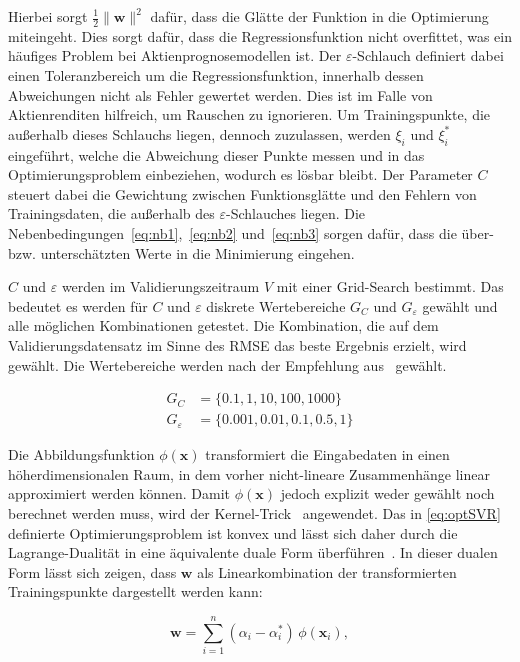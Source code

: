 Hierbei sorgt $\frac{1}{2}\|\mathbf{w}\|^2$ dafür, dass die Glätte der Funktion in die Optimierung miteingeht. Dies sorgt dafür, dass die Regressionsfunktion nicht overfittet, was ein häufiges Problem bei Aktienprognosemodellen ist. Der $\varepsilon$-Schlauch definiert dabei einen Toleranzbereich um die Regressionsfunktion, innerhalb dessen Abweichungen nicht als Fehler gewertet werden. Dies ist im Falle von Aktienrenditen hilfreich, um Rauschen zu ignorieren. Um Trainingspunkte, die außerhalb dieses Schlauchs liegen, dennoch zuzulassen, werden $\xi_i$ und $\xi_i^*$ eingeführt, welche die Abweichung dieser Punkte messen und in das Optimierungsproblem einbeziehen, wodurch es lösbar bleibt. Der Parameter $C$ steuert dabei die Gewichtung zwischen Funktionsglätte und den Fehlern von Trainingsdaten, die außerhalb des $\varepsilon$-Schlauches liegen. Die Nebenbedingungen~\ref{eq:nb1},~\ref{eq:nb2} und~\ref{eq:nb3} sorgen dafür, dass die über- bzw. unterschätzten Werte in die Minimierung eingehen.

$C$ und $\varepsilon$ werden im Validierungszeitraum $V$ mit einer Grid-Search bestimmt. Das bedeutet es werden für $C$ und $\varepsilon$ diskrete Wertebereiche $G_C$ und $G_\varepsilon$ gewählt und alle möglichen Kombinationen getestet. Die Kombination, die auf dem Validierungsdatensatz im Sinne des \ac{RMSE} das beste Ergebnis erzielt, wird gewählt. Die Wertebereiche werden nach der Empfehlung aus~\cite{hsu2003practical} gewählt.

\begin{align*}
    G_C           & = \{0.1, 1, 10, 100, 1000\}    \\
    G_\varepsilon & = \{0.001, 0.01, 0.1, 0.5, 1\}
\end{align*}


Die Abbildungsfunktion $\phi(\mathbf{x})$ transformiert die Eingabedaten in einen höherdimensionalen Raum, in dem vorher nicht-lineare Zusammenhänge linear approximiert werden können. Damit $\phi(\mathbf{x})$ jedoch explizit weder gewählt noch berechnet werden muss, wird der Kernel-Trick~\cite{Jaekel2007KernelMethods} angewendet. Das in \cref{eq:optSVR} definierte Optimierungsproblem ist konvex und lässt sich daher durch die Lagrange-Dualität in eine äquivalente duale Form überführen~\cite{Burges1998}. In dieser dualen Form lässt sich zeigen, dass $\mathbf{w}$ als Linearkombination der transformierten Trainingspunkte dargestellt werden kann:

\begin{equation}
    \mathbf{w} = \sum_{i=1}^{n} (\alpha_i - \alpha_i^*)\, \phi(\mathbf{x}_i),
\end{equation}

